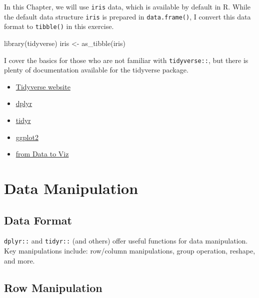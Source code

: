 \documentclass[
]{book}
\newenvironment{Shaded}{\begin{snugshade}}{\end{snugshade}}
\newcommand{\FunctionTok}[1]{\textcolor[rgb]{0.00,0.00,0.00}{#1}}
\newcommand{\NormalTok}[1]{#1}
\newcommand{\OtherTok}[1]{\textcolor[rgb]{0.56,0.35,0.01}{#1}}
\providecommand{\tightlist}{%
  \setlength{\itemsep}{0pt}\setlength{\parskip}{0pt}}
\begin{document}
In this Chapter, we will use \texttt{iris} data, which is available by default in R. While the default data structure \texttt{iris} is prepared in \texttt{data.frame()}, I convert this data format to \texttt{tibble()} in this exercise.

\begin{Shaded}
\begin{Highlighting}[]
\FunctionTok{library}\NormalTok{(tidyverse)}
\NormalTok{iris }\OtherTok{\textless{}{-}} \FunctionTok{as\_tibble}\NormalTok{(iris)}
\end{Highlighting}
\end{Shaded}

I cover the basics for those who are not familiar with \texttt{tidyverse::}, but there is plenty of documentation available for the tidyverse package.

\begin{itemize}
\tightlist
\item
  \href{https://www.tidyverse.org/}{Tidyverse website}
\item
  \href{https://dplyr.tidyverse.org/}{dplyr}
\item
  \href{https://tidyr.tidyverse.org/}{tidyr}
\item
  \href{https://r-graph-gallery.com/ggplot2-package.html}{ggplot2}
\item
  \href{https://www.data-to-viz.com/}{from Data to Viz}
\end{itemize}

\hypertarget{data-manipulation}{%
\section{Data Manipulation}\label{data-manipulation}}

\hypertarget{data-format}{%
\subsection{Data Format}\label{data-format}}

\texttt{dplyr::} and \texttt{tidyr::} (and others) offer useful functions for data manipulation. Key manipulations include: row/column manipulations, group operation, reshape, and more.

\hypertarget{row-manipulation}{%
\subsection{Row Manipulation}\label{row-manipulation}}
\end{document}
